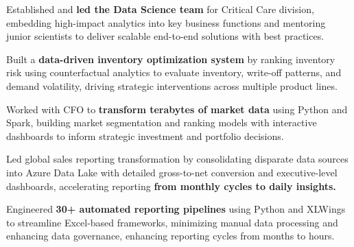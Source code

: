 \documentclass[letterpaper,11pt]{article}
\newcommand{\resumeItem}[1]{
  \item{\small{#1}}
}
\begin{document}
    \resumeItem{Established and \textbf{led the Data Science team} for Critical Care division, embedding high-impact analytics into key business functions and mentoring junior scientists to deliver scalable end-to-end solutions with best practices.}




    \resumeItem{Built a \textbf{data-driven inventory optimization system} by ranking inventory risk using counterfactual analytics to evaluate inventory, write-off patterns, and demand volatility, driving strategic interventions across multiple product lines.}
    
    \resumeItem{Worked with CFO to \textbf{transform terabytes of market data} using Python and Spark, building market segmentation and ranking models with interactive dashboards to inform strategic investment and portfolio decisions.}

    \resumeItem{Led global sales reporting transformation by consolidating disparate data sources into Azure Data Lake with detailed gross-to-net conversion and executive-level dashboards, accelerating reporting \textbf{from monthly cycles to daily insights.}}

    \resumeItem{Engineered \textbf{30+ automated reporting pipelines} using Python and XLWings to streamline Excel-based frameworks, minimizing manual data processing and enhancing data governance, enhancing reporting cycles from months to hours.}
    
    
   

    


    


    

    
\end{document}
